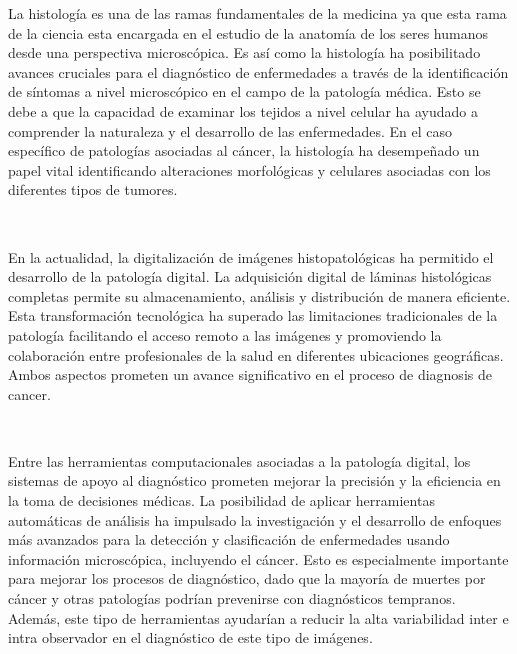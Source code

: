 \documentclass[12pt,letterpaper,final, openany]{scrbook}
\begin{document}
La histología es una de las ramas fundamentales de la medicina ya que esta rama de la ciencia esta encargada en el estudio de la anatomía de los seres humanos desde una perspectiva microscópica. Es así como la histología ha posibilitado avances cruciales para el diagnóstico de enfermedades a través de la identificación de síntomas a nivel microscópico en el campo de la patología médica. Esto se debe a que la capacidad de examinar los tejidos a nivel celular ha ayudado a comprender la naturaleza y el desarrollo de las enfermedades. En el caso específico de patologías asociadas al cáncer, la histología ha desempeñado un papel vital identificando alteraciones morfológicas y celulares asociadas con los diferentes tipos de tumores.

\\
\vspace{4mm}

En la actualidad, la digitalización de imágenes histopatológicas ha permitido el desarrollo de la patología digital. La adquisición digital de láminas histológicas completas permite su almacenamiento, análisis y distribución de manera eficiente. Esta transformación tecnológica ha superado las limitaciones tradicionales de la patología facilitando el acceso remoto a las imágenes y promoviendo la colaboración entre profesionales de la salud en diferentes ubicaciones geográficas. Ambos aspectos prometen un avance significativo en el proceso de diagnosis de cancer.

\\
\vspace{4mm}

Entre las herramientas computacionales asociadas a la patología digital, los sistemas de apoyo al diagnóstico prometen mejorar la precisión y la eficiencia en la toma de decisiones médicas. La posibilidad de aplicar herramientas automáticas de análisis ha impulsado la investigación y el desarrollo de enfoques más avanzados para la detección y clasificación de enfermedades usando información microscópica, incluyendo el cáncer. Esto es especialmente importante para mejorar los procesos de diagnóstico, dado que la mayoría de muertes por cáncer y otras patologías podrían prevenirse con diagnósticos tempranos. Además, este tipo de herramientas ayudarían a reducir la alta variabilidad inter e intra observador en el diagnóstico de este tipo de imágenes. 

\\
\vspace{4mm}
\end{document}
